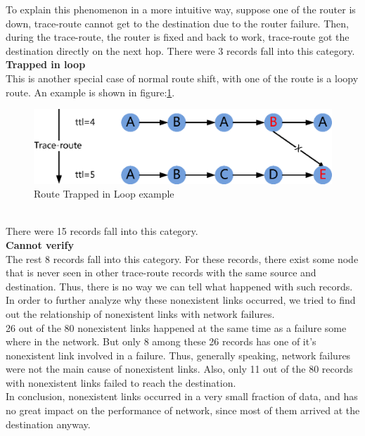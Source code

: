 \documentclass[conference, twocolumn, oneside, 10pt]{IEEEtran}
\begin{document}
To explain this phenomenon in a more intuitive way, suppose one of the router is
down, trace-route cannot get to the destination due to the router failure. Then,
during the trace-route, the router is fixed and back to work, trace-route got
the destination directly on the next hop. There were 3 records fall into this
category.\\
\textbf{Trapped in loop}\\
This is another special case of normal route shift, with one of the route is a
loopy route. An example is shown in figure:\ref{fig:TrappedInLoop}.\\
\begin{figure}[h!]
  \centering
  \includegraphics[scale=0.5]{plot/TrappedInLoop.eps}
  \caption{Route Trapped in Loop example}
  \label{fig:TrappedInLoop}
\end{figure}\\
There were 15 records fall into this category.\\
\textbf{Cannot verify}\\
The rest 8 records fall into this category. For these records, there exist some
node that is never seen in other trace-route records with the same source and
destination. Thus, there is no way we can tell what happened with such
records.\\ 

In order to further analyze why these nonexistent links occurred, we tried to
find out the relationship of nonexistent links with network failures.\\
26 out of the 80 nonexistent links happened at the same time as a failure some
where in the network. But only 8 among these 26 records has one of it's
nonexistent link involved in a failure. Thus, generally speaking, network
failures were not the main cause of nonexistent links. Also, only 11 out of the
80 records with nonexistent links failed to reach the destination. \\
In conclusion, nonexistent links occurred in a very small fraction of data, and
has no great impact on the performance of network, since most of them arrived at
the destination anyway.
\end{document}
